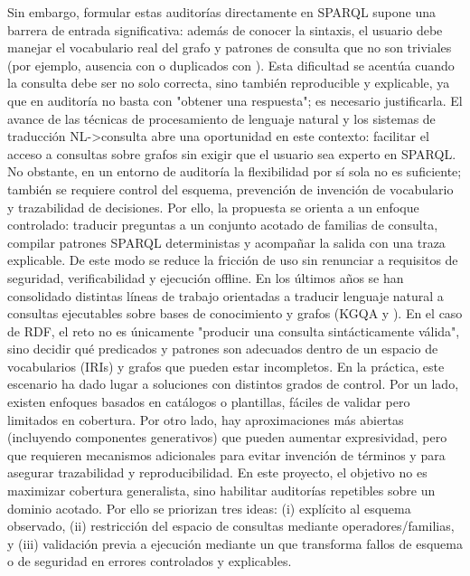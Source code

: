 {}Sin embargo, formular estas auditorías directamente en SPARQL supone una barrera de entrada significativa: además de conocer la sintaxis, el usuario debe manejar el vocabulario real del grafo y patrones de consulta que no son triviales (por ejemplo, ausencia con  o duplicados con ). Esta dificultad se acentúa cuando la consulta debe ser no solo correcta, sino también reproducible y explicable, ya que en auditoría no basta con "obtener una respuesta"; es necesario justificarla.\markdownRendererInterblockSeparator
{}El avance de las técnicas de procesamiento de lenguaje natural y los sistemas de traducción NL->consulta abre una oportunidad en este contexto: facilitar el acceso a consultas sobre grafos sin exigir que el usuario sea experto en SPARQL. No obstante, en un entorno de auditoría la flexibilidad por sí sola no es suficiente; también se requiere control del esquema, prevención de invención de vocabulario y trazabilidad de decisiones.\markdownRendererInterblockSeparator
{}Por ello, la propuesta se orienta a un enfoque controlado: traducir preguntas a un conjunto acotado de familias de consulta, compilar patrones SPARQL deterministas y acompañar la salida con una traza explicable. De este modo se reduce la fricción de uso sin renunciar a requisitos de seguridad, verificabilidad y ejecución offline.\markdownRendererInterblockSeparator
{}\markdownRendererInterblockSeparator
{}En los últimos años se han consolidado distintas líneas de trabajo orientadas a traducir lenguaje natural a consultas ejecutables sobre bases de conocimiento y grafos (KGQA y ). En el caso de RDF, el reto no es únicamente "producir una consulta sintácticamente válida", sino decidir qué predicados y patrones son adecuados dentro de un espacio de vocabularios (IRIs) y grafos que pueden estar incompletos.\markdownRendererInterblockSeparator
{}En la práctica, este escenario ha dado lugar a soluciones con distintos grados de control. Por un lado, existen enfoques basados en catálogos o plantillas, fáciles de validar pero limitados en cobertura. Por otro lado, hay aproximaciones más abiertas (incluyendo componentes generativos) que pueden aumentar expresividad, pero que requieren mecanismos adicionales para evitar invención de términos y para asegurar trazabilidad y reproducibilidad.\markdownRendererInterblockSeparator
{}En este proyecto, el objetivo no es maximizar cobertura generalista, sino habilitar auditorías repetibles sobre un dominio acotado. Por ello se priorizan tres ideas: (i)  explícito al esquema observado, (ii) restricción del espacio de consultas mediante operadores/familias, y (iii) validación previa a ejecución mediante un  que transforma fallos de esquema o de seguridad en errores controlados y explicables.\markdownRendererInterblockSeparator
